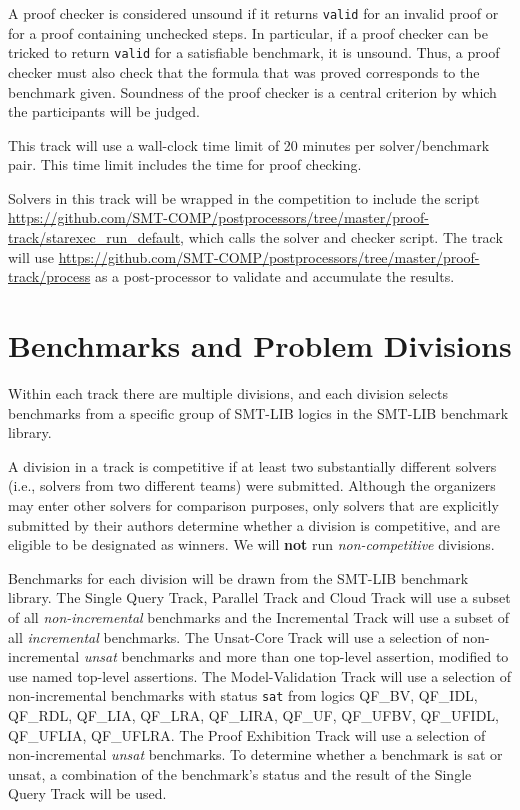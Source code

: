 \documentclass[12pt]{article}
\newcommand{\maintrack}{Single Query Track\xspace}
\newcommand{\inctrack}{Incremental Track\xspace}
\newcommand{\ucoretrack}{Unsat-Core Track\xspace}
\newcommand{\mvaltrack}{Model-Validation Track\xspace}
\newcommand{\challtrack}{Industry-Challenge Track\xspace}
\newcommand{\paralleltrack}{Parallel Track\xspace}
\newcommand{\cloudtrack}{Cloud Track\xspace}
\newcommand{\prooftrack}{Proof Exhibition Track\xspace}
\begin{document}
A proof checker is considered unsound if it returns \texttt{valid} for
an invalid proof or for a proof containing unchecked steps.  In
particular, if a proof checker can be tricked to return \texttt{valid}
for a satisfiable benchmark, it is unsound.  Thus, a proof checker
must also check that the formula that was proved corresponds to the
benchmark given.  Soundness of the proof checker is a central
criterion by which the participants will be judged.

This track will use a wall-clock time limit of 20 minutes per solver/benchmark
pair. This time limit includes the time for proof checking.

Solvers in this track will be wrapped in the competition to include the script
{\url{https://github.com/SMT-COMP/postprocessors/tree/master/proof-track/starexec_run_default}}, which calls the solver and checker script.
The track will use
{\url{https://github.com/SMT-COMP/postprocessors/tree/master/proof-track/process}}
as a post-processor
to validate and accumulate the results.


\section{Benchmarks and Problem Divisions}

%
Within each track there are multiple divisions, and each division selects
benchmarks from a specific group of SMT-LIB logics in the SMT-LIB benchmark
library.

A division in a track is competitive if at least two substantially
different solvers (i.e., solvers from two different teams) were
submitted.  Although the organizers may enter other solvers for
comparison purposes, only solvers that are explicitly submitted by
their authors determine whether a division is competitive, and are
eligible to be designated as winners.
We will \textbf{not} run \emph{non-competitive} divisions.

Benchmarks for each division will be drawn from the SMT-LIB benchmark
library.  The \maintrack, \paralleltrack{} and \cloudtrack{} will use a
subset of all \emph{non-incremental} benchmarks and the \inctrack will
use a subset of all \emph{incremental} benchmarks.
%
%
The \ucoretrack will use a selection of non-incremental
\emph{unsat} benchmarks
and more than one top-level assertion, modified to use named
top-level assertions.  The \mvaltrack will use a selection of non-incremental
benchmarks with status \texttt{sat} from logics QF\_BV, QF\_IDL, QF\_RDL,
QF\_LIA, QF\_LRA, QF\_LIRA, QF\_UF, QF\_UFBV, QF\_UFIDL, QF\_UFLIA, QF\_UFLRA.
The \prooftrack will use a selection of non-incremental
\emph{unsat} benchmarks.
To determine whether a benchmark is sat or unsat, a combination of
the benchmark's status and the result of the \maintrack{} will be used.
\end{document}
